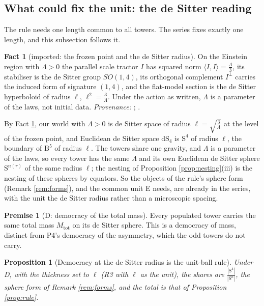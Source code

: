\documentclass[11pt]{article}
\newtheorem{proposition}[theorem]{Proposition}
\theoremstyle{definition}
\newtheorem{fact}[theorem]{Fact}
\newtheorem{premise}[theorem]{Premise}
\newcommand{\ip}[2]{\langle #1, #2\rangle}
\newcommand{\B}{\mathrm{B}}
\newcommand{\Sph}{\mathrm{S}}
\newcommand{\dS}{\mathrm{dS}}
\begin{document}
\subsection{What could fix the unit: the de Sitter reading}\label{subsec:unit}

The rule needs one length common to all towers. The series fixes exactly one length, and this subsection follows it.

\begin{fact}[imported: the frozen point and the de Sitter radius]\label{fact:dsradius}
On the Einstein region with $\Lambda > 0$ the parallel scale tractor $I$ has squared norm $\ip{I}{I} = \tfrac{\Lambda}{3}$, its stabiliser is the de Sitter group $SO(1,4)$, its orthogonal complement $I^{\perp}$ carries the induced form of signature $(1,4)$, and the flat-model section is the de Sitter hyperboloid of radius $\ell$, $\ell^{2} = \tfrac{3}{\Lambda}$. Under the action as written, $\Lambda$ is a parameter of the laws, not initial data. \emph{Provenance:} \cite[Thm.~4.7, Prop.~4.10, Prop.~4.4]{ButlerT6}; \cite[Fact~2.1, Thm.~3.1, Prop.~5.8]{ButlerT10}.
\end{fact}

By Fact \ref{fact:dsradius}, our world with $\Lambda > 0$ is de Sitter space of radius $\ell = \sqrt{\tfrac{3}{\Lambda}}$ at the level of the frozen point, and Euclidean de Sitter space $\dS_{4}$ is $\Sph^{4}$ of radius $\ell$, the boundary of $\B^{5}$ of radius $\ell$. The towers share one gravity, and $\Lambda$ is a parameter of the laws, so every tower has the same $\Lambda$ and its own Euclidean de Sitter sphere $\Sph^{n(r)}$ of the same radius $\ell$; the nesting of Proposition \ref{prop:nesting}(iii) is the nesting of these spheres by equators. So the objects of the rule's sphere form (Remark \ref{rem:forms}), and the common unit E needs, are already in the series, with the unit the de Sitter radius rather than a microscopic spacing.

\begin{premise}[D: democracy of the total mass]\label{prem:D}
Every populated tower carries the same total mass $M_{\mathrm{tot}}$ on its de Sitter sphere. This is a democracy of mass, distinct from P4's democracy of the asymmetry, which the odd towers do not carry.
\end{premise}

\begin{proposition}[Democracy at the de Sitter radius is the unit-ball rule]\label{prop:democracy}
Under D, with the thickness set to $\ell$ (R3 with $\ell$ as the unit), the shares are $\tfrac{|\Sph^{4}|}{|\Sph^{n}|}$, the sphere form of Remark \ref{rem:forms}, and the total is that of Proposition \ref{prop:rule}.
\end{proposition}
\end{document}
